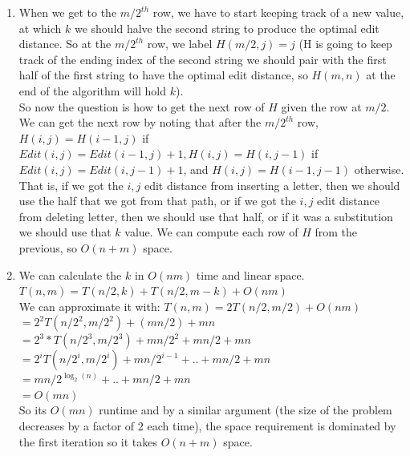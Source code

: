 \documentclass[11pt]{article}
\begin{document}
\begin{enumerate}
\begin{enumerate}
\item When we get to the $m/2^{th}$ row, we have to start keeping track of a new value, at which $k$ we should halve the second string to produce the optimal edit distance. So at the $m/2^{th}$ row, we label $H(m/2,j)=j$ (H is going to keep track of the ending index of the second string we should pair with the first half of the first string to have the optimal edit distance, so $H(m,n)$ at the end of the algorithm will hold $k$).\\
So now the question is how to get the next row of $H$ given the row at $m/2$. We can get the next row by noting that after the $m/2^{th}$ row, $H(i,j)=H(i-1,j)$ if $Edit(i,j)=Edit(i-1,j)+1, H(i,j)=H(i,j-1)$ if $Edit(i,j)=Edit(i,j-1)+1$, and $H(i,j)=H(i-1,j-1)$ otherwise. That is, if we got the $i,j$ edit distance from inserting a letter, then we should use the half that we got from that path, or if we got the $i,j$ edit distance from deleting  letter, then we should use that half, or if it was a substitution we should use that $k$ value. We can compute each row of $H$ from the previous, so $O(n+m)$ space.

\item We can calculate the $k$ in $O(nm)$ time and linear space. \\
$T(n,m)=T(n/2,k)+T(n/2,m-k)+O(nm)$\\
We can approximate it with: $T(n,m)=2T(n/2,m/2)+O(nm)$\\
$=2^2T(n/2^2,m/2^2)+(mn/2)+mn$\\
$=2^3*T(n/2^3,m/2^3)+mn/2^2+mn/2+mn$\\
$=2^iT(n/2^i,m/2^i)+mn/2^{i-1}+..+mn/2+mn$\\
$=mn/2^{\log_2(n)}+..+mn/2+mn$\\
$=O(mn)$\\
So its $O(mn)$ runtime and by a similar argument (the size of the problem decreases by a factor of $2$ each time), the space requirement is dominated by the first iteration so it takes $O(n+m)$ space.


\end{enumerate}
\end{enumerate}
\end{document}
